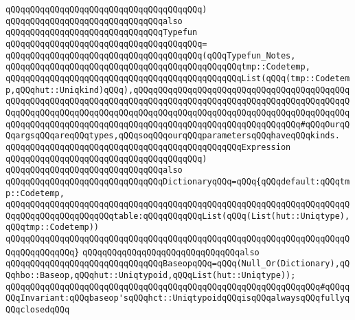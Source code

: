 \verb|qQQqqQQqqQQqqQQqqQQqqQQqqQQqqQQqqQQqqQQq)|\newline
\newline
\verb|qQQqqQQqqQQqqQQqqQQqqQQqqQQqqQQqalso|\newline
\verb|qQQqqQQqqQQqqQQqqQQqqQQqqQQqqQQqTypefun|\newline
\verb|qQQqqQQqqQQqqQQqqQQqqQQqqQQqqQQqqQQqqQQq=|\newline
\verb|qQQqqQQqqQQqqQQqqQQqqQQqqQQqqQQqqQQqqQQq(qQQqTypefun_Notes,|\newline
\verb|qQQqqQQqqQQqqQQqqQQqqQQqqQQqqQQqqQQqqQQqqQQqqQQqtmp::Codetemp,|\newline
\verb|qQQqqQQqqQQqqQQqqQQqqQQqqQQqqQQqqQQqqQQqqQQqqQQqList(qQQq(tmp::Codetemp,qQQqhut::Uniqkind)qQQq),qQQqqQQqqQQqqQQqqQQqqQQqqQQqqQQqqQQqqQQqqQQqqQQqqQQqqQQqqQQqqQQqqQQqqQQqqQQqqQQqqQQqqQQqqQQqqQQqqQQqqQQqqQQqqQQqqQQqqQQqqQQqqQQqqQQqqQQqqQQqqQQqqQQqqQQqqQQqqQQqqQQqqQQqqQQqqQQqqQQqqQQqqQQqqQQqqQQqqQQqqQQqqQQqqQQqqQQqqQQqqQQqqQQqqQQqqQQqqQQqqQQq#qQQqOurqQQqargsqQQqareqQQqtypes,qQQqsoqQQqourqQQqparametersqQQqhaveqQQqkinds.|\newline
\verb|qQQqqQQqqQQqqQQqqQQqqQQqqQQqqQQqqQQqqQQqqQQqqQQqExpression|\newline
\verb|qQQqqQQqqQQqqQQqqQQqqQQqqQQqqQQqqQQqqQQq)|\newline
\newline
\verb|qQQqqQQqqQQqqQQqqQQqqQQqqQQqqQQqalso|\newline
\verb|qQQqqQQqqQQqqQQqqQQqqQQqqQQqqQQqDictionaryqQQq=qQQq{qQQqdefault:qQQqtmp::Codetemp,|\newline
\verb|qQQqqQQqqQQqqQQqqQQqqQQqqQQqqQQqqQQqqQQqqQQqqQQqqQQqqQQqqQQqqQQqqQQqqQQqqQQqqQQqqQQqqQQqqQQqtable:qQQqqQQqqQQqList(qQQq(List(hut::Uniqtype),qQQqtmp::Codetemp))|\newline
\verb|qQQqqQQqqQQqqQQqqQQqqQQqqQQqqQQqqQQqqQQqqQQqqQQqqQQqqQQqqQQqqQQqqQQqqQQqqQQqqQQqqQQq}|\newline
\newline
\verb|qQQqqQQqqQQqqQQqqQQqqQQqqQQqqQQqalso|\newline
\verb|qQQqqQQqqQQqqQQqqQQqqQQqqQQqqQQqBaseopqQQq=qQQq(Null_Or(Dictionary),qQQqhbo::Baseop,qQQqhut::Uniqtypoid,qQQqList(hut::Uniqtype));|\newline
\newline
\verb|qQQqqQQqqQQqqQQqqQQqqQQqqQQqqQQqqQQqqQQqqQQqqQQqqQQqqQQqqQQqqQQq#qQQqqQQqInvariant:qQQqbaseop'sqQQqhct::UniqtypoidqQQqisqQQqalwaysqQQqfullyqQQqclosedqQQq|\newline
\newline
